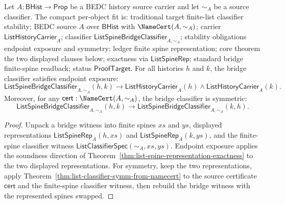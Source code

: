\begin{theorem}
\label{thm:list-spine-bridge-endpoint-exposure-symmetry}
Let $A:\mathsf{BHist}\to\mathsf{Prop}$ be a BEDC history source carrier and let
$\sim_A$ be a source classifier. The compact per-object fit is: traditional
target finite-list classifier stability; BEDC source $A$ over $\mathsf{BHist}$
with $\NameCert(A,\sim_A)$; carrier $\mathsf{ListHistoryCarrier}_A$; classifier
$\mathsf{ListSpineBridgeClassifier}_{A,\sim_A}$; stability obligations endpoint
exposure and symmetry; ledger finite spine representation; core theorem the two
displayed clauses below; exactness via $\mathsf{ListSpineRep}$; standard bridge
finite-spine readback; status $\mathsf{ProofTarget}$. For all histories $h$ and
$k$, the bridge classifier satisfies endpoint exposure:
$$
\mathsf{ListSpineBridgeClassifier}_{A,\sim_A}(h,k)
\to
\mathsf{ListHistoryCarrier}_A(h)\land \mathsf{ListHistoryCarrier}_A(k).
$$
Moreover, for any $\mathsf{cert}:\NameCert(A,\sim_A)$, the bridge classifier is
symmetric:
$$
\mathsf{ListSpineBridgeClassifier}_{A,\sim_A}(h,k)
\to
\mathsf{ListSpineBridgeClassifier}_{A,\sim_A}(k,h).
$$
\end{theorem}
\begin{proof}
Unpack a bridge witness into finite spines $xs$ and $ys$, displayed
representations $\mathsf{ListSpineRep}_A(h,xs)$ and
$\mathsf{ListSpineRep}_A(k,ys)$, and the finite-spine classifier witness
$\mathsf{ListClassifierSpec}(\sim_A,xs,ys)$. Endpoint exposure applies the
soundness direction of Theorem~\ref{thm:list-spine-representation-exactness} to
the two displayed representations. For symmetry, keep the two representations,
apply Theorem~\ref{thm:list-classifier-symm-from-namecert} to the source
certificate $\mathsf{cert}$ and the finite-spine classifier witness, then rebuild
the bridge witness with the represented spines swapped.
\end{proof}

